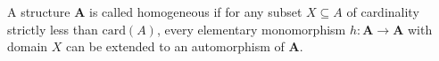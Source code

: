 A structure $\mathbf{A}$ is called homogeneous if for any subset $X \subseteq A$ of cardinality strictly less than $\text{card}(A)$, every elementary monomorphism $h : \mathbf{A} \to \mathbf{A}$ with domain $X$ can be extended to an automorphism of $\mathbf{A}$.
